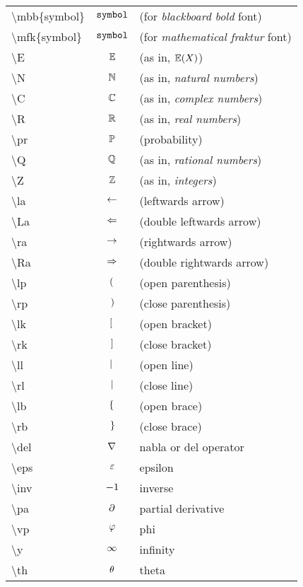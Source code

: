 \noindent
\begin{tabular}{lcl}

\textbackslash mbb\{symbol\} & $\mathbb{\mathtt{symbol}}$ & (for \emph{blackboard bold} font) \\
\textbackslash mfk\{symbol\} & $\mathfrak{\mathtt{symbol}}$ & (for \emph{mathematical fraktur} font) \\
\textbackslash E & $\mathbb{E}$ & (as in, \emph{$\mathbb{E}(X)$}) \\
\textbackslash N & $\mathbb{N}$ & (as in, \emph{natural numbers}) \\
\textbackslash C & $\mathbb{C}$ & (as in, \emph{complex numbers}) \\
\textbackslash R & $\mathbb{R}$ & (as in, \emph{real numbers}) \\
\textbackslash pr & $\mathbb{P}$ & (probability) \\
\textbackslash Q & $\mathbb{Q}$ & (as in, \emph{rational numbers}) \\
\textbackslash Z & $\mathbb{Z}$ & (as in, \emph{integers}) \\
\textbackslash la & $\leftarrow$ & (leftwards arrow) \\
\textbackslash La & $\Leftarrow$ & (double leftwards arrow) \\
\textbackslash ra & $\rightarrow$ & (rightwards arrow) \\
\textbackslash Ra & $\Rightarrow$ & (double rightwards arrow) \\
\textbackslash lp & $\lp\r.$ & (open parenthesis) \\
\textbackslash rp & $\l.\rp$ & (close parenthesis) \\
\textbackslash lk & $\lk\r.$ & (open bracket) \\
\textbackslash rk & $\l.\rk$ & (close bracket) \\
\textbackslash ll & $\ll\r.$ & (open line) \\
\textbackslash rl & $\l.\rl$ & (close line) \\
\textbackslash lb & $\lb\r.$ & (open brace) \\
\textbackslash rb & $\l.\rb$ & (close brace) \\
\textbackslash del & $\nabla$ & nabla or del operator \\
\textbackslash eps & $\varepsilon$ & epsilon \\
\textbackslash inv & ${-1}$ & inverse \\
\textbackslash pa & $\partial$ & partial derivative \\
\textbackslash vp & $\varphi$ & phi \\
\textbackslash y & $\infty$ & infinity \\
\textbackslash th & $\theta$ & theta \\
\end{tabular}

